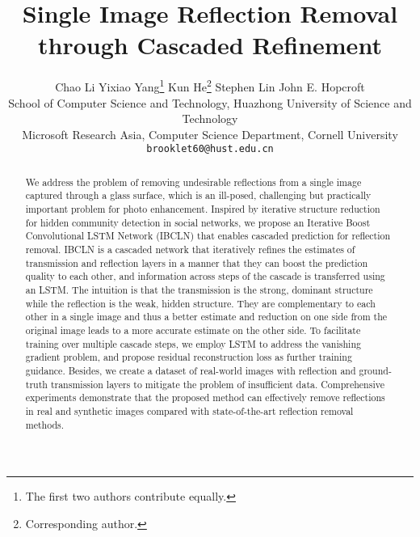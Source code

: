 \documentclass[10pt,twocolumn,letterpaper]{article}
\begin{document}
    
\title{Single Image Reflection Removal through Cascaded Refinement} \author{Chao Li  \quad Yixiao Yang\thanks{The first two authors contribute equally.} \quad  Kun He\thanks{Corresponding author.}  
    \quad  Stephen Lin \quad John E. Hopcroft \\
    \small
    School of Computer Science and Technology, Huazhong University of Science and Technology\\
    \small
    Microsoft Research Asia,  
    \small
    Computer Science Department, Cornell University\\
    {\tt\small brooklet60@hust.edu.cn}}\maketitle
    \thispagestyle{empty}
    


\begin{abstract}
We address the problem of removing undesirable reflections from a single image captured through a glass surface, which is an ill-posed, challenging but practically important problem for photo enhancement. Inspired by iterative structure reduction for hidden community detection in social networks, we propose an Iterative Boost Convolutional LSTM Network (IBCLN) that enables cascaded prediction for reflection removal.
IBCLN is a cascaded network that iteratively refines the estimates of transmission and reflection layers in a manner that they can boost the prediction quality to each other, and information across steps of the cascade is transferred using an LSTM. 
The intuition is that the transmission is the strong, dominant structure while the reflection is the weak, hidden structure. They are complementary to each other in a single image and thus a better estimate and reduction on one side from the original image leads to a more accurate estimate on the other side.
To facilitate training over multiple cascade steps, we employ LSTM to address the vanishing gradient problem, and propose residual reconstruction loss as further training guidance. 
Besides, we create a dataset of real-world images with reflection and ground-truth transmission layers to mitigate the problem of insufficient data. 
Comprehensive experiments demonstrate that the proposed method can effectively remove reflections in real and synthetic images compared with state-of-the-art reflection removal methods.
\end{abstract}
\end{document}
